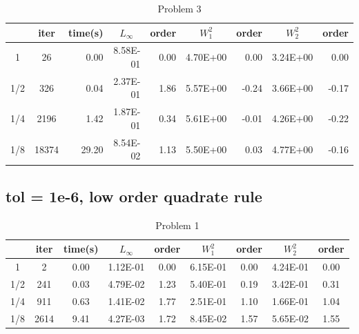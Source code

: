 \documentclass{article}
\begin{document}
\begin{table}[H]
	\centering
	\caption{Problem 3}
	\begin{tabular}{|c|c|r|r|r|r|r|r|r|}
		\hline
		& iter  & \multicolumn{1}{c|}{time(s)} & \multicolumn{1}{c|}{$L_{\infty}$} & \multicolumn{1}{c|}{order} & \multicolumn{1}{c|}{$W_1^2$} & \multicolumn{1}{c|}{order} & \multicolumn{1}{c|}{$W_2^2$} & \multicolumn{1}{c|}{order} \\ \hline
		1   & 26    & 0.00                         & 8.58E-01                          & 0.00                       & 4.70E+00                     & 0.00                       & 3.24E+00                     & 0.00                       \\ \hline
		1/2 & 326   & 0.04                         & 2.37E-01                          & 1.86                       & 5.57E+00                     & -0.24                      & 3.66E+00                     & -0.17                      \\ \hline
		1/4 & 2196  & 1.42                         & 1.87E-01                          & 0.34                       & 5.61E+00                     & -0.01                      & 4.26E+00                     & -0.22                      \\ \hline
		1/8 & 18374 & 29.20                        & 8.54E-02                          & 1.13                       & 5.50E+00                     & 0.03                       & 4.77E+00                     & -0.16                      \\ \hline
	\end{tabular}
\end{table}


\subsection{tol = 1e-6, low order quadrate rule}
\begin{table}[H]
	\centering
	\caption{Problem 1}
	\begin{tabular}{|c|c|c|c|c|c|c|c|c|}
		\hline
		& iter & time(s) & $L_{\infty}$ & order & $W_1^2$  & order & $W_2^2$  & order \\ \hline
		1   & 2    & 0.00    & 1.12E-01     & 0.00  & 6.15E-01 & 0.00  & 4.24E-01 & 0.00  \\ \hline
		1/2 & 241  & 0.03    & 4.79E-02     & 1.23  & 5.40E-01 & 0.19  & 3.42E-01 & 0.31  \\ \hline
		1/4 & 911  & 0.63    & 1.41E-02     & 1.77  & 2.51E-01 & 1.10  & 1.66E-01 & 1.04  \\ \hline
		1/8 & 2614 & 9.41    & 4.27E-03     & 1.72  & 8.45E-02 & 1.57  & 5.65E-02 & 1.55  \\ \hline
	\end{tabular}
\end{table}
\end{document}
